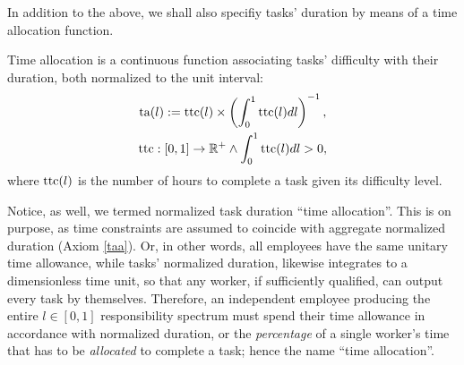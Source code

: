 \documentclass[hidelinks, nonatbib]{elsarticle}
\begin{document}
In addition to the above, we shall also specifiy tasks' duration by means of a time allocation function.
\begin{definition}
    \label{ta}
    Time allocation is a continuous function associating tasks' difficulty with their duration, both normalized to the unit interval:
    \begin{gather}
        \text{ta}(l)
        :=
        \text{ttc}(l)
        \times
        \left(
            \int_{0}^{1}
            \text{ttc}(l)
            dl
        \right) ^ {-1}
        ,
        \\
        \text{ttc}
        :
        [0,1]
        \rightarrow
        \mathbb{R}^{+}        
        \land
        \int_{0}^{1}
            \text{ttc}(l)
            dl
            >
            0
        ,
    \end{gather}
    where $\text{ttc}(l)$ is the number of hours to complete a task given its difficulty level.
    
    Notice, as well, we termed normalized task duration ``time allocation''. This is on purpose, as time constraints are assumed to coincide with aggregate normalized duration (Axiom \ref{taa}). Or, in other words, all employees have the same unitary time allowance, while tasks' normalized duration, likewise integrates to a dimensionless time unit, so that any worker, if sufficiently qualified, can output every task by themselves. Therefore, an independent employee producing the entire $l \in [0,1]$ responsibility spectrum must spend their time allowance in accordance with normalized duration, or the \textit{percentage} of a single worker's time that has to be \textit{allocated} to complete a task; hence the name ``time allocation''.
\end{definition}
\end{document}
